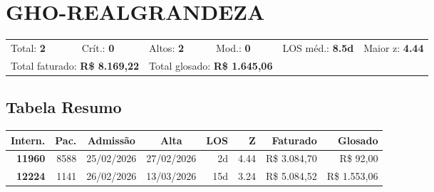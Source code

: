 \documentclass[a4paper,10pt]{article}
\begin{document}
\clearpage
\section{GHO-REALGRANDEZA}
\begin{tcolorbox}[colback=lightblue,colframe=jcubeblue,title={\textbf{Resumo --- GHO-REALGRANDEZA}}]
\begin{tabular}{ll@{\quad}ll@{\quad}ll}
Total: \textbf{2} &
Cr\'{i}t.: \textcolor{anomred}{\textbf{0}} &
Altos: \textcolor{anomorange}{\textbf{2}} &
Mod.: \textcolor{anomyellow}{\textbf{0}} &
LOS m\'{e}d.: \textbf{8.5d} &
Maior z: \textbf{4.44} \\

\multicolumn{2}{l}{Total faturado: \textbf{R\$ 8.169,22}} & 
\multicolumn{2}{l}{\textcolor{anomred}{Total glosado: \textbf{R\$ 1.645,06}}} & & \\

\end{tabular}
\end{tcolorbox}

\subsection{Tabela Resumo}
\begin{center}
\begin{longtable}{>{\scriptsize}r>{\scriptsize}r>{\scriptsize}c>{\scriptsize}c>{\scriptsize}r>{\scriptsize}r>{\scriptsize}r>{\scriptsize}r}
\toprule
\textbf{Intern.} & \textbf{Pac.} & \textbf{Admiss\~{a}o} & \textbf{Alta} & \textbf{LOS} & \textbf{Z} & \textbf{Faturado} & \textbf{Glosado} \\
\midrule
\endhead
\bottomrule
\endfoot

\textcolor{anomorange}{\textbf{11960}} & 8588 & 25/02/2026 & 27/02/2026 & 2d & \textcolor{anomorange}{4.44} & R\$ 3.084,70 & \textcolor{anomred}{R\$ 92,00} \\

\textcolor{anomorange}{\textbf{12224}} & 1141 & 26/02/2026 & 13/03/2026 & 15d & \textcolor{anomorange}{3.24} & R\$ 5.084,52 & \textcolor{anomred}{R\$ 1.553,06} \\

\end{longtable}\end{center}
\end{document}
